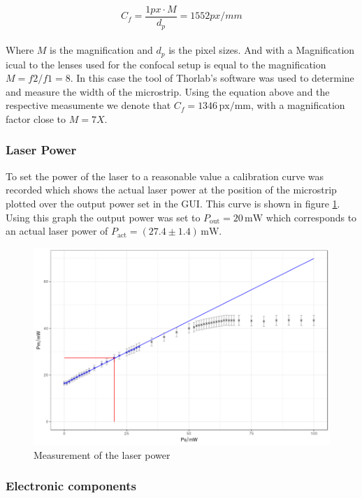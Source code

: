 \begin{equation}
C_{f}=\dfrac{1 px \cdot M}{d_{p}} = 1552 px/mm
\end{equation}\\
Where $M$ is the magnification and $d_{p}$ is the pixel sizes. And with a Magnification icual to the lenses used for the confocal setup is equal to the magnification $M=f2/f1=8$.
In this case the tool of Thorlab’s software was used to determine and measure the width of the microstrip. Using the equation above and the respective measumente we denote that  $C_{f} =1346 \,\mathrm{px/mm}$, with a magnification factor close to $M=7X$.

\subsubsection{Laser Power}
To set the power of the laser to a reasonable value a calibration curve was recorded which shows the actual laser power at the position of the microstrip plotted over the output power set in the GUI. This curve is shown in figure \ref{fig:power}.\\

Using this graph the output power was set to $P_\text{out}=20\,\mathrm{mW}$ which corresponds to an actual laser power of $P_\text{act}=(27.4\pm1.4)\,\mathrm{mW}$.
\begin{figure}[hb]
	\centering
	\includegraphics[width=\textwidth]{../figures/powercal.png}
	\caption{Measurement of the laser power}
	\label{fig:power}
\end{figure}


\subsubsection{Electronic components}

